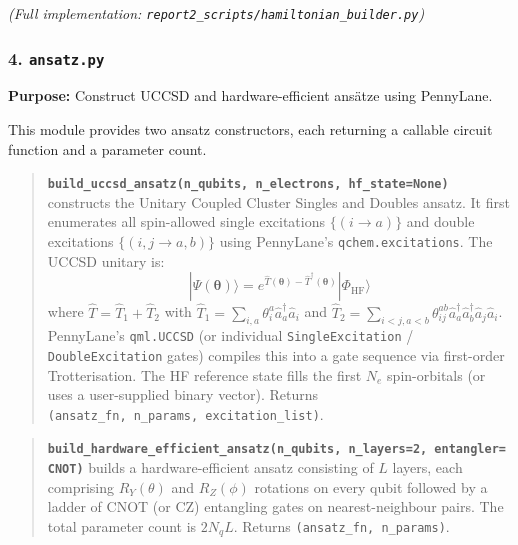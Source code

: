 \documentclass[
  11pt,
]{report}
\begin{document}
\emph{(Full implementation:
\texttt{report2\_scripts/hamiltonian\_builder.py})}

\subsubsection{\texorpdfstring{4.
\texttt{ansatz.py}}{4. ansatz.py}}\label{ansatz.py}

\textbf{Purpose:} Construct UCCSD and hardware-efficient ansätze using
PennyLane.

This module provides two ansatz constructors, each returning a callable
circuit function and a parameter count.

\begin{quote}
\textbf{\texttt{build\_uccsd\_ansatz(n\_qubits,\ n\_electrons,\ hf\_state=None)}}
constructs the Unitary Coupled Cluster Singles and Doubles ansatz. It
first enumerates all spin-allowed single excitations \(\{(i \to a)\}\)
and double excitations \(\{(i,j \to a,b)\}\) using PennyLane's
\texttt{qchem.excitations}. The UCCSD unitary is:
\[|\Psi(\boldsymbol{\theta})\rangle = e^{\hat{T}(\boldsymbol{\theta}) - \hat{T}^\dagger(\boldsymbol{\theta})}|\Phi_{\text{HF}}\rangle\]
where \(\hat{T} = \hat{T}_1 + \hat{T}_2\) with
\(\hat{T}_1 = \sum_{i,a}\theta_i^a \hat{a}_a^\dagger \hat{a}_i\) and
\(\hat{T}_2 = \sum_{i<j,a<b}\theta_{ij}^{ab}\hat{a}_a^\dagger\hat{a}_b^\dagger\hat{a}_j\hat{a}_i\).
PennyLane's \texttt{qml.UCCSD} (or individual \texttt{SingleExcitation}
/ \texttt{DoubleExcitation} gates) compiles this into a gate sequence
via first-order Trotterisation. The HF reference state fills the first
\(N_e\) spin-orbitals (or uses a user-supplied binary vector). Returns
\texttt{(ansatz\_fn,\ n\_params,\ excitation\_list)}.
\end{quote}

\begin{quote}
\textbf{\texttt{build\_hardware\_efficient\_ansatz(n\_qubits,\ n\_layers=2,\ entangler=\textquotesingle{}CNOT\textquotesingle{})}}
builds a hardware-efficient ansatz consisting of \(L\) layers, each
comprising \(R_Y(\theta)\) and \(R_Z(\phi)\) rotations on every qubit
followed by a ladder of CNOT (or CZ) entangling gates on
nearest-neighbour pairs. The total parameter count is \(2 N_q L\).
Returns \texttt{(ansatz\_fn,\ n\_params)}.
\end{quote}
\end{document}
